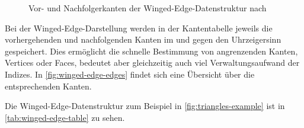 \begin{figure}[ht]
\centering
{}
\caption{Vor- und Nachfolgerkanten der Winged-Edge-Datenstruktur nach \cite[591]{baumgart1975polyhedron}}
\label{fig:winged-edge-edges}
\end{figure}

Bei der Winged-Edge-Darstellung werden in der Kantentabelle jeweils die vorhergehenden und nachfolgenden Kanten im und gegen den Uhrzeigersinn gespeichert.
Dies ermöglicht die schnelle Bestimmung von angrenzenden Kanten, Vertices oder Faces, bedeutet aber gleichzeitig auch viel Verwaltungsaufwand der Indizes.
In \autoref{fig:winged-edge-edges} findet sich eine Übersicht über die entsprechenden Kanten.

Die Winged-Edge-Datenstruktur zum Beispiel in \autoref{fig:triangles-example} ist in \autoref{tab:winged-edge-table} zu sehen.


